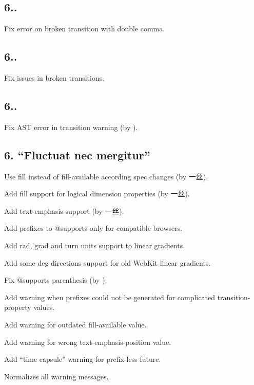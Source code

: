 \subsection*{6..}


\begin{DoxyItemize}
\item Fix error on broken transition with double comma.
\end{DoxyItemize}

\subsection*{6..}


\begin{DoxyItemize}
\item Fix issues in broken transitions.
\end{DoxyItemize}

\subsection*{6..}


\begin{DoxyItemize}
\item Fix A\+ST error in transition warning (by ).
\end{DoxyItemize}

\subsection*{6. “\+Fluctuat nec mergitur”}


\begin{DoxyItemize}
\item Use {\ttfamily fill} instead of {\ttfamily fill-\/available} according spec changes (by 一丝).
\item Add {\ttfamily fill} support for logical dimension properties (by 一丝).
\item Add {\ttfamily text-\/emphasis} support (by 一丝).
\item Add prefixes to {\ttfamily @supports} only for compatible browsers.
\item Add {\ttfamily rad}, {\ttfamily grad} and {\ttfamily turn} units support to linear gradients.
\item Add some {\ttfamily deg} directions support for old Web\+Kit linear gradients.
\item Fix {\ttfamily @supports} parenthesis (by ).
\item Add warning when prefixes could not be generated for complicated {\ttfamily transition-\/property} values.
\item Add warning for outdated {\ttfamily fill-\/available} value.
\item Add warning for wrong {\ttfamily text-\/emphasis-\/position} value.
\item Add “time capsule” warning for prefix-\/less future.
\item Normalizes all warning messages.
\end{DoxyItemize}

